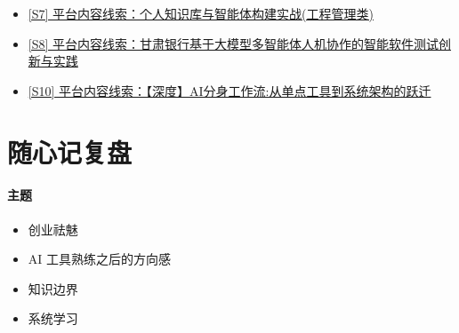 \documentclass[UTF8,zihao=-4]{ctexart}
\begin{document}
\begin{itemize}[leftmargin=2em]
\item \href{https://weixin.sogou.com/link?url=dn9a_-gY295K0Rci_xozVXfdMkSQTLW6cwJThYulHEtVjXrGTiVgS2rVltFLkJqLbDjuaCaJVykq7LeflhQuhlqXa8Fplpd96R_0enJUxU7cWXHWLTo6dwPG0ZhgLP5e5oLGHR5k3zu6nqL2KQqTv6MLs7FTovXXh54-cgT1v79gMi-uvv6bkbpAiYnR-H_5uxs8bmqjvKAkRx_YsTZop440NYe-iHy3kJf8_CHZe1csTYxcqYI2F_MoqS_9d5zXgpCXU7-u38N535pjGOOjYg..&type=2&query=%E5%A4%9A%E6%99%BA%E8%83%BD%E4%BD%93%E5%8D%8F%E4%BD%9C%20%E4%B8%AA%E4%BA%BA%E7%9F%A5%E8%AF%86%E7%AE%A1%E7%90%86%20%E5%B7%A5%E4%BD%9C%E6%B5%81&token=330088C06CC021EDD6D084FB26161CAED7C4929C6A204042}{[S7] 平台内容线索：个人知识库与智能体构建实战(工程管理类)}
\item \href{https://weixin.sogou.com/link?url=dn9a_-gY295K0Rci_xozVXfdMkSQTLW6cwJThYulHEtVjXrGTiVgS2rVltFLkJqLbDjuaCaJVykq7LeflhQuhlqXa8Fplpd9DpI9wAqjVjhSIt7DYhcnmDU-vVsIFga9yg8hMDEbdrdH6fF-KUMgCoUqb12fX__l6vZQMGZCwadClauKdhPHS0IzzM1k6SLXHG1PT0NhUpJFfG4wDQHvDTyXmBWavWmy4soJpg72_iT8RboVB0CurGUjvLeJwHDdKigQJJvEw2DdrgozfSg6bw..&type=2&query=%E5%A4%9A%E6%99%BA%E8%83%BD%E4%BD%93%E5%8D%8F%E4%BD%9C%20%E4%B8%AA%E4%BA%BA%E7%9F%A5%E8%AF%86%E7%AE%A1%E7%90%86%20%E5%B7%A5%E4%BD%9C%E6%B5%81&token=330088C06CC021EDD6D084FB26161CAED7C4929C6A204042}{[S8] 平台内容线索：甘肃银行基于大模型多智能体人机协作的智能软件测试创新与实践}
\item \href{https://weixin.sogou.com/link?url=dn9a_-gY295K0Rci_xozVXfdMkSQTLW6cwJThYulHEtVjXrGTiVgS2rVltFLkJqLbDjuaCaJVykq7LeflhQuhlqXa8Fplpd9g2Wu4kSFgK3iYvPs8fN_XUoN_aIg9vycazUhNjrtdcANSQYnVKIvgyY3OpX5P148QLJLDBrO8P5CYhLsWLcmjGjHhBrLVtMaUQMsEuCdb2PVsx3LIocXgCNKHFn4irKyXG2hRQNv6y7nMJ5lSGkEsOpNp_9N_EIum4HlYoXHVu5Ae0f8bRARvQ..&type=2&query=%E5%A4%9A%E6%99%BA%E8%83%BD%E4%BD%93%E5%8D%8F%E4%BD%9C%20%E4%B8%AA%E4%BA%BA%E7%9F%A5%E8%AF%86%E7%AE%A1%E7%90%86%20%E5%B7%A5%E4%BD%9C%E6%B5%81&token=330088C06CC021EDD6D084FB26161CAED7C4929C6A204042}{[S10] 平台内容线索：【深度】AI分身工作流:从单点工具到系统架构的跃迁}
\end{itemize}
\section*{随心记复盘}
\paragraph{主题}
\begin{itemize}[leftmargin=2em]
\item 创业祛魅
\item AI 工具熟练之后的方向感
\item 知识边界
\item 系统学习
\end{itemize}
\end{document}
